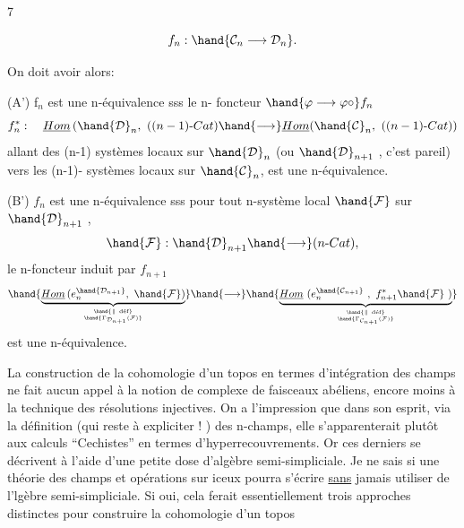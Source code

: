  \hfill 7

\[ f_n : \hand{\mathcal{C}_n \longrightarrow \mathcal{D}_n} . \]

On doit avoir alors:

(A') f$_n$ est une n-équivalence sss le n- foncteur $\hand{\varphi \longrightarrow \varphi\circ} f_n$
\[ f_n^*: \quad \underline{Hom}\, (\hand{\mathcal{D}}_n, \ ((n-1)\text{-}Cat) \hand{\longrightarrow} \underline{Hom}(\hand{\mathcal{C}}_n, \ ((n-1)\text{-}Cat)) \]
allant des (n-1) systèmes locaux sur $\hand{\mathcal{D}}_n$ (ou $\hand{\mathcal{D}}_{n+1}$ , c'est pareil) vers
les (n-1)- systèmes locaux sur $\hand{\mathcal{C}}_n$, est une n-équivalence.

(B') $f_n$ est une n-équivalence sss pour tout n-système local $\hand{\mathcal{F}}$ sur
$\hand{\mathcal{D}}_{n+1}$ ,
\[ \hand{\mathcal{F}} : \hand{\mathcal{D}}_{n+1} \hand{\longrightarrow} (n\text{-}Cat), \]
le n-foncteur induit par $f_{n+1}$
\[ \hand{\underbrace{{\normalcolor \underline{Hom}\, ( e_n^{\hand{\mathcal{D}_{n+1}}}, \ \hand{\mathcal{F}} )}}_{\hand{\parallel\ \text{déf}} \atop \hand{\Gamma_{\mathcal{D}_{n+1}}(\mathcal{F})}}} \hand{\longrightarrow} \hand{\underbrace{{\normalcolor \underline{Hom}\ (e_n^{\hand{\mathcal{C}_{n+1}}} \ , \ f^*_{n+1} \hand{\mathcal{F}} \ )}}_{\hand{\parallel\ \text{déf}} \atop \hand{\Gamma_{\mathcal{C}_{n+1}}(\mathcal{F})}}} \]
est une n-équivalence.

  La construction de la cohomologie d'un topos en termes d'intégration
des champs ne fait aucun appel à la notion de complexe de faisceaux abéliens,
encore moins à la technique des résolutions injectives. On a l'impression
que dans son esprit, via la définition (qui reste à expliciter ! ) des
n-champs, elle s'apparenterait plutôt aux calculs ``Cechistes'' en termes
d'hyperrecouvrements. Or ces derniers se décrivent à l'aide d'une petite
dose d'algèbre semi-simpliciale. Je ne sais si une théorie des champs
et opérations sur iceux pourra s'écrire \uline{sans} jamais utiliser de
l'lgèbre semi-simpliciale. Si oui, cela ferait essentiellement trois
approches distinctes pour construire la cohomologie d'un topos \over{\unsure{;}}{:}

